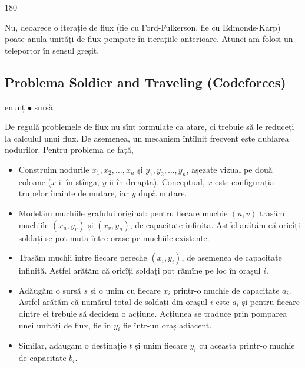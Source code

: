 \documentclass[../main.tex]{subfiles}
\begin{document}
\begin{turn}{180}
  \begin{minipage}{\linewidth}
    Nu, deoarece o iterație de flux (fie cu Ford-Fulkerson, fie cu Edmonds-Karp) poate anula unități de flux pompate în iterațiile anterioare. Atunci am folosi un teleportor în sensul greșit.
  \end{minipage}
\end{turn}



\subsection{Problema Soldier and Traveling (Codeforces)}
\label{problem:soldier-and-traveling}

\href{https://codeforces.com/contest/546/problem/E}{enunț}
$\bullet$
\hyperref[code:soldier-and-traveling]{sursă}

De regulă problemele de flux nu sînt formulate ca atare, ci trebuie să le reduceți la calculul unui flux. De asemenea, un mecanism întîlnit frecvent este dublarea nodurilor. Pentru problema de față,

\begin{itemize}
  \item Construim nodurile $x_1, x_2, \dots, x_n$ și $y_1, y_2, \dots, y_n$, așezate vizual pe două coloane ($x$-ii în stînga, $y$-ii în dreapta). Conceptual, $x$ este configurația trupelor înainte de mutare, iar $y$ după mutare.

  \item Modelăm muchiile grafului original: pentru fiecare muchie $(u, v)$ trasăm muchiile $(x_u, y_v)$ și $(x_v, y_u)$, de capacitate infinită. Astfel arătăm că oricîți soldați se pot muta între orașe pe muchiile existente.

  \item Trasăm muchii între fiecare pereche $(x_i, y_i)$, de asemenea de capacitate infinită. Astfel arătăm că oricîți soldați pot rămîne pe loc în orașul $i$.

  \item Adăugăm o sursă $s$ și o unim cu fiecare $x_i$ printr-o muchie de capacitate $a_i$. Astfel arătăm că numărul total de soldați din orașul $i$ este $a_i$ și pentru fiecare dintre ei trebuie să decidem o acțiune. Acțiunea se traduce prin pomparea unei unități de flux, fie în $y_i$ fie într-un oraș adiacent.

  \item Similar, adăugăm o destinație $t$ și unim fiecare $y_i$ cu aceasta printr-o muchie de capacitate $b_i$.
\end{itemize}
\end{document}
